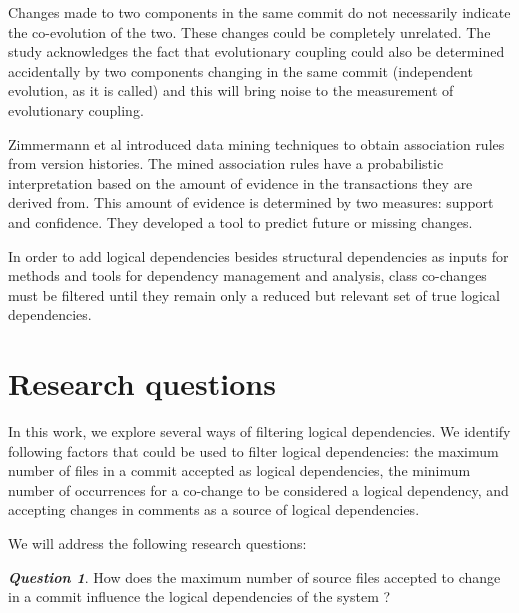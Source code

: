 \documentclass[a4paper,twoside]{article}
\begin{document}
Changes made to two components in the same commit do not necessarily indicate the co-evolution of the two. These changes could be completely unrelated. The study \cite{Yu2007} acknowledges the fact that evolutionary coupling could also be determined accidentally by two components changing in the same commit (independent evolution, as it is called) and this will bring noise to the measurement of evolutionary coupling. 


Zimmermann et al \cite{Zimmermann:2004:MVH:998675.999460} introduced data mining techniques to obtain association
rules from version histories.
The mined association rules  have a probabilistic interpretation based on the amount of
evidence in the transactions they are derived from. This
amount of evidence is determined by two measures: 
support and confidence.  They developed a tool to predict future or
missing changes.




In order to add logical dependencies besides structural dependencies as inputs for methods and tools for dependency management and analysis, class co-changes must be filtered until they remain only a reduced but relevant set of true logical dependencies. 


\section{Research questions}
\label{sec:question}

In this work, we explore several ways of filtering logical dependencies.  We identify following factors that could be used to filter logical dependencies: the maximum number of files in a commit accepted as logical dependencies, the minimum number of occurrences for a co-change to be considered a logical dependency, and accepting changes in comments as a source of logical dependencies. 

We will address the following research questions:


\textit{\textbf{Question 1}}. How does the maximum number of source files accepted to change in a commit influence the logical dependencies of the system ? 
\end{document}
